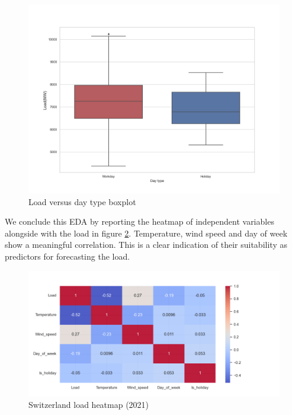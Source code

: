 \begin{figure}[!h]
    \includegraphics[width=\textwidth]{images/CH_is_holiday_boxplot_2021.png}
    \caption{Load versus day type boxplot}
    \label{fig:CH_is_holiday_boxplot_2021}
\end{figure}

We conclude this EDA by reporting the heatmap of independent variables alongside with the load in figure \ref{fig:CH_heatmap_2021}. Temperature, wind speed and day of week show a meaningful correlation. This is a clear indication of their suitability as predictors for forecasting the load.

\begin{figure}[!h]
    \includegraphics[width=\textwidth]{images/CH_heatmap_2021.png}
    \caption{Switzerland load heatmap (2021)}
    \label{fig:CH_heatmap_2021}
\end{figure}